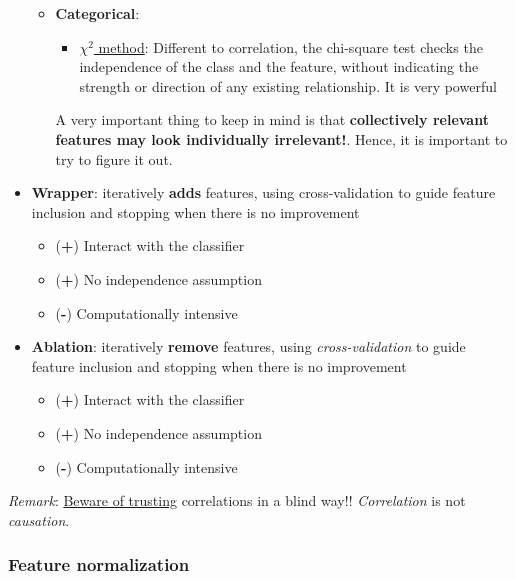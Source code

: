 \begin{itemize}
\begin{itemize}
\item \textbf{Categorical}: 
\begin{itemize}
\item \href{https://en.wikipedia.org/wiki/Chi-squared_test}{$\chi^2$ method}: Different to correlation, the chi-square test checks the independence of the class and the feature, without indicating the strength or direction of any existing relationship. It is very powerful
\end{itemize}

A very important thing to keep in mind is that \textbf{collectively relevant features may look individually irrelevant!}. Hence, it is important to try to figure it out.
\end{itemize}

\item \textbf{Wrapper}: iteratively \textbf{adds} features, using cross-validation to guide feature inclusion and stopping when there is no improvement

\begin{itemize}
\item (\textbf{+}) Interact with the classifier
\item (\textbf{+}) No independence assumption
\item (\textbf{-}) Computationally intensive
\end{itemize}

\item \textbf{Ablation}: iteratively \textbf{remove} features, using \emph{cross-validation} to guide feature inclusion and stopping when there is no improvement

\begin{itemize}
\item (\textbf{+}) Interact with the classifier
\item (\textbf{+}) No independence assumption
\item (\textbf{-}) Computationally intensive
\end{itemize}

\end{itemize}

\emph{Remark}: \href{http://www.tylervigen.com/spurious-correlations}{Beware of trusting} correlations in a blind way!! \emph{Correlation} is not \emph{causation}.

\subsubsection*{Feature normalization}


